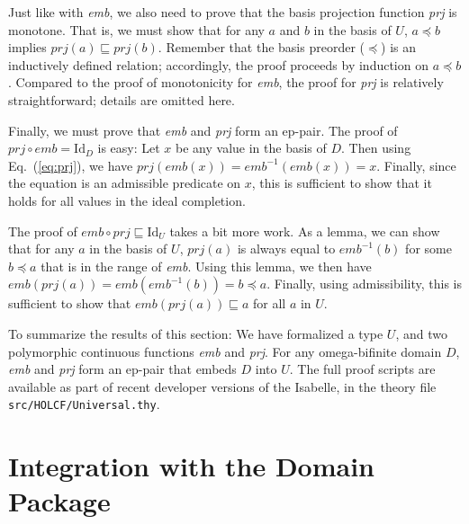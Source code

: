 \documentclass{llncs}
\begin{document}
Just like with \emph{emb}, we also need to prove that the basis
projection function \emph{prj} is monotone.  That is, we must show
that for any $a$ and $b$ in the basis of $U$, $a \preceq b$ implies
$\mathit{prj}(a) \sqsubseteq \mathit{prj}(b)$.  Remember that the
basis preorder ($\preceq$) is an inductively defined relation;
accordingly, the proof proceeds by induction on $a \preceq b$.
Compared to the proof of monotonicity for \emph{emb}, the proof for
\emph{prj} is relatively straightforward; details are omitted here.

Finally, we must prove that \emph{emb} and \emph{prj} form an ep-pair.
The proof of $\mathit{prj} \circ \mathit{emb} = \mathrm{Id}_D$ is
easy: Let $x$ be any value in the basis of $D$.  Then using
Eq.~(\ref{eq:prj}), we have $\mathit{prj}(\mathit{emb}(x)) =
\mathit{emb}^{-1}(\mathit{emb}(x)) = x$.  Finally, since the equation
is an admissible predicate on $x$, this is sufficient to show that it
holds for all values in the ideal completion.

The proof of $\mathit{emb} \circ \mathit{prj} \sqsubseteq
\mathrm{Id}_U$ takes a bit more work.  As a lemma, we can show that
for any $a$ in the basis of $U$, $\mathit{prj}(a)$ is always equal to
$\mathit{emb}^{-1}(b)$ for some $b \preceq a$ that is in the range of
\emph{emb}.  Using this lemma, we then have
$\mathit{emb}(\mathit{prj}(a)) = \mathit{emb}(\mathit{emb}^{-1}(b)) =
b \preceq a$.  Finally, using admissibility, this is sufficient to
show that $\mathit{emb}(\mathit{prj}(a)) \sqsubseteq a$ for all $a$ in
$U$.

To summarize the results of this section: We have formalized a type
$U$, and two polymorphic continuous functions \emph{emb} and
\emph{prj}.  For any omega-bifinite domain $D$, \emph{emb} and
\emph{prj} form an ep-pair that embeds $D$ into $U$.  The full proof
scripts are available as part of recent developer versions of the
Isabelle, in the theory file \texttt{src/HOLCF/Universal.thy}.

\section{\label{sec:package}Integration with the Domain Package}
\end{document}
